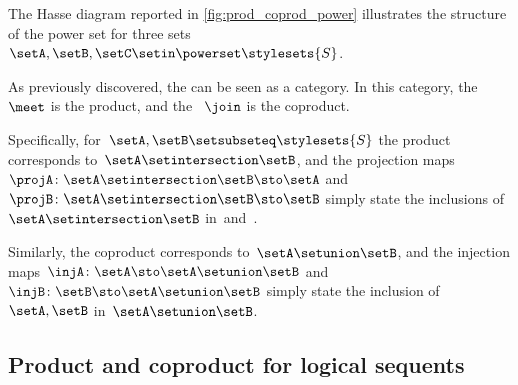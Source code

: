 \begin{marginfigure}
    \centering
    \caption{}
    \label{fig:prod_coprod_power}
\end{marginfigure}

The Hasse diagram reported in \cref{fig:prod_coprod_power} illustrates the structure of the power set  for three sets~$\setA,\setB,\setC\setin \powerset \stylesets{S}$.

As previously discovered, the  can be seen as a category.
In this category, the ~$\meet$ is the product, and the ~$\join$ is the coproduct.

Specifically, for~$\setA,\setB\setsubseteq\stylesets{S}$ the product corresponds to~$\setA\setintersection \setB$, and the projection maps~$\projA\colon \setA\setintersection \setB \sto \setA$ and~$\projB\colon \setA\setintersection \setB \sto \setB$ simply state the inclusions of~$\setA\setintersection \setB$ in~\setA and~\setB.

Similarly, the coproduct corresponds to~$\setA\setunion \setB$, and the injection maps~$\injA\colon \setA \sto \setA\setunion \setB$ and~$\injB\colon \setB \sto \setA\setunion \setB$ simply state the inclusion of~$\setA,\setB$ in~$\setA\setunion \setB$.

\ifextraspace{\vfill\clearpage}

\subsection{Product and coproduct for logical sequents}

